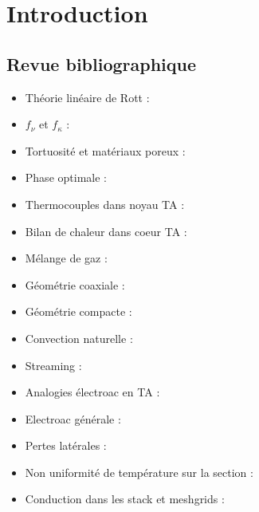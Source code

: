 \chapter{Introduction}\label{chap:Intro}%
\mylocaltoc

\section{Revue bibliographique}

\begin{itemize}
    \item Théorie linéaire de Rott : \cite{rott_damped_1969, rott_thermally_1973, rott_thermally_1975, rott_thermally_1976, zouzoulas_thermally_1976, rott_thermoacoustics_1980, muller_thermally_1983} 
    \item $f_\nu$ et $f_\kappa$ : \cite{swift_thermoacoustics_2017,di_giulio_wire_2023}
    \item Tortuosité et matériaux poreux : \cite{johnson_theory_1987}
    \item Phase optimale : \cite{poignand_etude_2006}
    \item Thermocouples dans noyau TA : \cite{duffourd_refrigerateur_2001, penelet_etude_2004}
    \item Bilan de chaleur dans coeur TA : \cite{penelet_etude_2004}
    \item Mélange de gaz : \cite{belcher_working_1999}
    \item Géométrie coaxiale : \cite{poignand_analysis_2013, poignand_thermoacoustic_2011, tijani_study_2008, ramadan_design_2021}
    \item Géométrie compacte : \cite{poignand_etude_2006}
    \item Convection naturelle : \cite{ross_influence_2003, hireche_numerical_2019, pan_visualization_2012, bianchi_transferts_2004, babaei_investigation_2010, gardner_cascade_2003}
    \item Streaming : \cite{so_internal_2006, bailliet_acoustic_2001, ramadan_experimental_2018}
    \item Analogies électroac en TA : \cite{wakeland_use_2000, backhaus_thermoacoustic-stirling_2000, poignand_analysis_2013}
    \item Electroac générale : \cite{rossi_electroacoustique_1986, novak_measurement_2019}
    \item Pertes latérales : \cite{penelet_etude_2004, guedra_etudes_2012}
    \item Non uniformité de température sur la section : \cite{penelet_etude_2004}
    \item Conduction dans les stack et meshgrids : \cite{hsu_effective_1996, li_effective_2006, g_correlations_2022}
\end{itemize}

